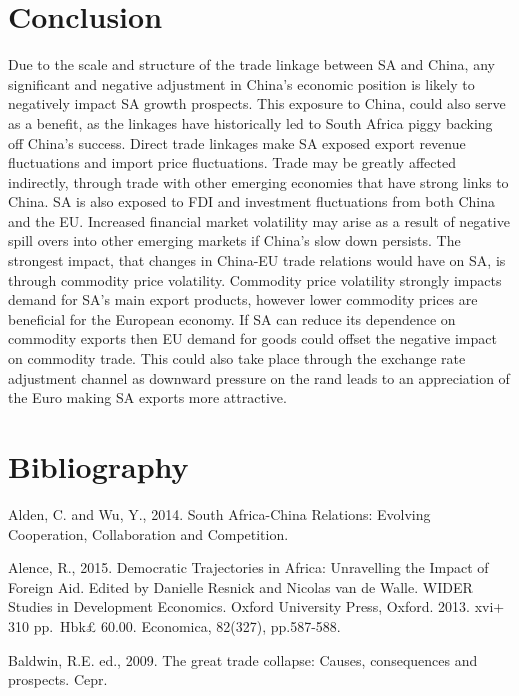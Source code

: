\documentclass[11pt,preprint, authoryear]{elsarticle}
\numberwithin{equation}{section}
\numberwithin{figure}{section}
\numberwithin{table}{section}
\begin{document}
\hypertarget{conclusion}{%
\section{Conclusion}\label{conclusion}}

Due to the scale and structure of the trade linkage between SA and
China, any significant and negative adjustment in China's economic
position is likely to negatively impact SA growth prospects. This
exposure to China, could also serve as a benefit, as the linkages have
historically led to South Africa piggy backing off China's success.
Direct trade linkages make SA exposed export revenue fluctuations and
import price fluctuations. Trade may be greatly affected indirectly,
through trade with other emerging economies that have strong links to
China. SA is also exposed to FDI and investment fluctuations from both
China and the EU. Increased financial market volatility may arise as a
result of negative spill overs into other emerging markets if China's
slow down persists. The strongest impact, that changes in China-EU trade
relations would have on SA, is through commodity price volatility.
Commodity price volatility strongly impacts demand for SA's main export
products, however lower commodity prices are beneficial for the European
economy. If SA can reduce its dependence on commodity exports then EU
demand for goods could offset the negative impact on commodity trade.
This could also take place through the exchange rate adjustment channel
as downward pressure on the rand leads to an appreciation of the Euro
making SA exports more attractive.

\newpage

\hypertarget{bibliography}{%
\section{Bibliography}\label{bibliography}}

Alden, C. and Wu, Y., 2014. South Africa-China Relations: Evolving
Cooperation, Collaboration and Competition.

Alence, R., 2015. Democratic Trajectories in Africa: Unravelling the
Impact of Foreign Aid. Edited by Danielle Resnick and Nicolas van de
Walle. WIDER Studies in Development Economics. Oxford University Press,
Oxford. 2013. xvi+ 310 pp.~Hbk£ 60.00. Economica, 82(327), pp.587-588.

Baldwin, R.E. ed., 2009. The great trade collapse: Causes, consequences
and prospects. Cepr.
\end{document}
